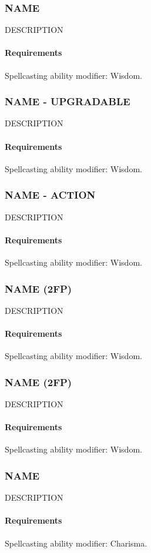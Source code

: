 \subsubsection{NAME} \label{feat::name}
    DESCRIPTION
    \paragraph{Requirements} Spellcasting ability modifier: Wisdom.
\subsubsection{NAME - UPGRADABLE} \label{feat::name}
    DESCRIPTION
    \paragraph{Requirements} Spellcasting ability modifier: Wisdom.
\subsubsection{NAME - ACTION} \label{feat::name}
    DESCRIPTION
    \paragraph{Requirements} Spellcasting ability modifier: Wisdom.
\subsubsection{NAME (2FP)} \label{feat::name}
    DESCRIPTION
    \paragraph{Requirements} Spellcasting ability modifier: Wisdom.
\subsubsection{NAME (2FP)} \label{feat::name}
    DESCRIPTION
    \paragraph{Requirements} Spellcasting ability modifier: Wisdom.

\subsubsection{NAME} \label{feat::name}
    DESCRIPTION
    \paragraph{Requirements} Spellcasting ability modifier: Charisma.
